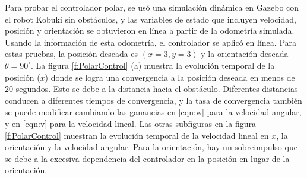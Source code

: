 Para probar el controlador polar, se usó una simulación dinámica en Gazebo con el robot 
Kobuki sin obstáculos, y las variables de estado que incluyen velocidad, posición y 
orientación se obtuvieron en línea a partir de la odometría simulada. Usando la información 
de esta odometría, el controlador se aplicó en línea. Para estas pruebas, la posición deseada
es $(x = 3, y = 3)$ y la orientación deseada $\theta = 90^{\circ}$. La figura 
\ref{f:PolarControl} (a) muestra la evolución temporal de la posición ($x$) donde 
se logra una convergencia a la posición deseada en menos de 20 segundos. Esto se debe a 
la distancia hacia el obstáculo. Diferentes distancias conducen a diferentes tiempos de 
convergencia, y la tasa de convergencia también se puede modificar cambiando las 
ganancias en \ref{eqn:w} para la velocidad angular, y en \ref{eqn:v} para la velocidad 
lineal. Las otras subfiguras en la figura \ref{f:PolarControl} muestran la evolución 
temporal de la velocidad lineal en $x$, la orientación y la velocidad angular. Para la 
orientación, hay un sobreimpulso que se debe a la excesiva dependencia del controlador 
en la posición en lugar de la orientación.
